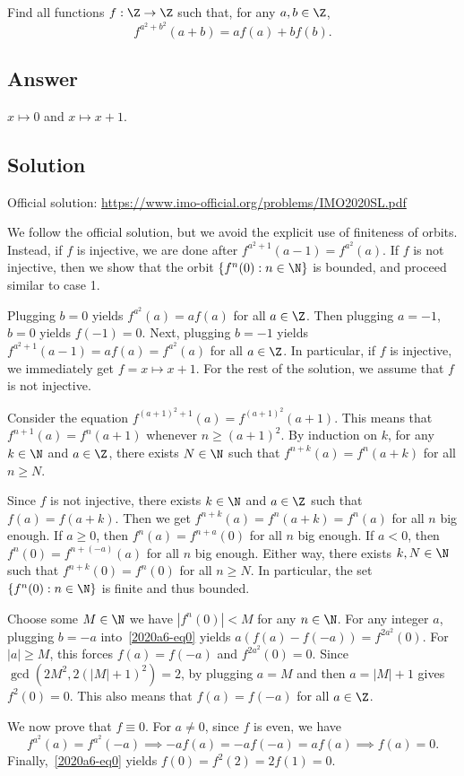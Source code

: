 Find all functions $f : \Z \to \Z$ such that, for any $a, b \in \Z$,
\[ f^{a^2 + b^2}(a + b) = a f(a) + b f(b). \tag{*}\label{2020a6-eq0} \]



\subsection*{Answer}

$x \mapsto 0$ and $x \mapsto x + 1$.



\subsection*{Solution}

Official solution: \url{https://www.imo-official.org/problems/IMO2020SL.pdf}

We follow the official solution, but we avoid the explicit use of finiteness of orbits.
Instead, if $f$ is injective, we are done after $f^{a^2 + 1}(a - 1) = f^{a^2}(a)$.
If $f$ is not injective, then we show that the orbit $\{f^n(0) : n \in \N\}$ is bounded, and proceed similar to case 1.

Plugging $b = 0$ yields $f^{a^2}(a) = a f(a)$ for all $a \in \Z$.
Then plugging $a = -1$, $b = 0$ yields $f(-1) = 0$.
Next, plugging $b = -1$ yields $f^{a^2 + 1}(a - 1) = a f(a) = f^{a^2}(a)$ for all $a \in \Z$.
In particular, if $f$ is injective, we immediately get $f = x \mapsto x + 1$.
For the rest of the solution, we assume that $f$ is not injective.

Consider the equation $f^{(a + 1)^2 + 1}(a) = f^{(a + 1)^2}(a + 1)$.
This means that $f^{n + 1}(a) = f^n(a + 1)$ whenever $n \geq (a + 1)^2$.
By induction on $k$, for any $k \in \N$ and $a \in \Z$, there exists $N \in \N$ such that $f^{n + k}(a) = f^n(a + k)$ for all $n \geq N$.

Since $f$ is not injective, there exists $k \in \N$ and $a \in \Z$ such that $f(a) = f(a + k)$.
Then we get $f^{n + k}(a) = f^n(a + k) = f^n(a)$ for all $n$ big enough.
If $a \geq 0$, then $f^n(a) = f^{n + a}(0)$ for all $n$ big enough.
If $a < 0$, then $f^n(0) = f^{n + (-a)}(a)$ for all $n$ big enough.
Either way, there exists $k, N \in \N$ such that $f^{n + k}(0) = f^n(0)$ for all $n \geq N$.
In particular, the set $\{f^n(0) : n \in \N\}$ is finite and thus bounded.

Choose some $M \in \N$ we have $|f^n(0)| < M$ for any $n \in \N$.
For any integer $a$, plugging $b = -a$ into~\eqref{2020a6-eq0} yields $a (f(a) - f(-a)) = f^{2a^2}(0)$.
For $|a| \geq M$, this forces $f(a) = f(-a)$ and $f^{2a^2}(0) = 0$.
Since $\gcd(2M^2, 2(|M| + 1)^2) = 2$, by plugging $a = M$ and then $a = |M| + 1$ gives $f^2(0) = 0$.
This also means that $f(a) = f(-a)$ for all $a \in \Z$.

We now prove that $f \equiv 0$.
For $a \neq 0$, since $f$ is even, we have
\[ f^{a^2}(a) = f^{a^2}(-a) \implies -a f(a) = -a f(-a) = a f(a) \implies f(a) = 0. \]
Finally,~\eqref{2020a6-eq0} yields $f(0) = f^2(2) = 2 f(1) = 0$.
